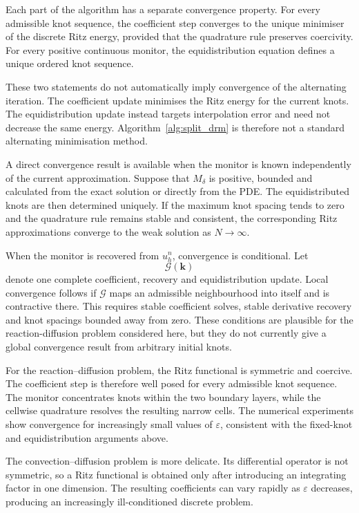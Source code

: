 \documentclass[11pt, onecolumn]{report}
\begin{document}
Each part of the algorithm has a separate convergence property. For every admissible knot sequence, the coefficient step converges to the unique minimiser of the discrete Ritz energy, provided that the quadrature rule preserves coercivity. For every positive continuous monitor, the equidistribution equation defines a unique ordered knot sequence.

These two statements do not automatically imply convergence of the alternating iteration. The coefficient update minimises the Ritz energy for the current knots. The equidistribution update instead targets interpolation error and need not decrease the same energy. Algorithm~\ref{alg:split_drm} is therefore not a standard alternating minimisation method.

A direct convergence result is available when the monitor is known independently of the current approximation. Suppose that \(M_\delta\) is positive, bounded and calculated from the exact solution or directly from the PDE. The equidistributed knots are then determined uniquely. If the maximum knot spacing tends to zero and the quadrature rule remains stable and consistent, the corresponding Ritz approximations converge to the weak solution as \(N\rightarrow\infty\).

When the monitor is recovered from \(u_h^n\), convergence is conditional. Let
\begin{equation*}
    \mathcal G(\mathbf k)
\end{equation*}
denote one complete coefficient, recovery and equidistribution update. Local convergence follows if \(\mathcal G\) maps an admissible neighbourhood into itself and is contractive there. This requires stable coefficient solves, stable derivative recovery and knot spacings bounded away from zero. These conditions are plausible for the reaction-diffusion problem considered here, but they do not currently give a global convergence result from arbitrary initial knots.

For the reaction--diffusion problem, the Ritz functional is symmetric and coercive. The coefficient step is therefore well posed for every admissible knot sequence. The monitor concentrates knots within the two boundary layers, while the cellwise quadrature resolves the resulting narrow cells. The numerical experiments show convergence for increasingly small values of \(\varepsilon\), consistent with the fixed-knot and equidistribution arguments above.

The convection--diffusion problem is more delicate. Its differential operator is not symmetric, so a Ritz functional is obtained only after introducing an integrating factor in one dimension. The resulting coefficients can vary rapidly as \(\varepsilon\) decreases, producing an increasingly ill-conditioned discrete problem.
\end{document}
